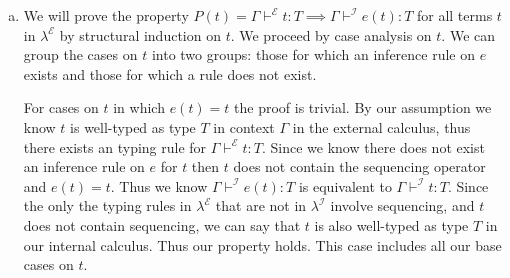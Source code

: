 \documentclass[12pt, fleqn]{article}
\begin{document}
\begin{enumerate}[(a)]
    \textbf{Case:} E-App2\\
    If $e(t)$ evaluates to $e(t')$ by E-App2 then we know $e(t') = (\lambda x: \textrm{Unit}.\:t_2')\:\:t_1''$ and have the premise
    $t_1' \xrightarrow{\mathcal{I}} t_1''$. Setting $e(y) = t_1''$, by the definition of $e$ with the premises $x \notin FV(t_2')$
    and $e(t_2) = t_2'$ we have $t' = y\:\textrm{;}\:t_2$. By our induction hypothesis on $t_1$ with the premises $e(t_1) = t_1'$ and
    $t_1' \xrightarrow{\mathcal{I}} t_1''$ we know $t_1 \xrightarrow{\mathcal{E}} y$. Since $t_1 \xrightarrow{\mathcal{E}} y$, by E-Seq
    we know $t_1\:\textrm{;}\:t_2 \xrightarrow{\mathcal{E}} y\:\textrm{;}\:t_2$, which is $t \xrightarrow{\mathcal{E}} t'$. Thus our
    property holds for the E-App2 case.

    \textbf{Case:} E-AppAbs\\
    If $e(t)$ evaluates to $e(t')$ by E-AppAbs then we know $e(t') = t_2'$ since $x \notin FV(t_2')$ by our premises.
    By our premises $e(t_2) = t_2'$ thus $t' = t_2$. If $e(t)$ is well typed then we know $t_1$ must be a value of type Unit.
    The only value of type Unit is \texttt{unit}. Thus by setting $t_1 = \texttt{unit}$ and using the E-SeqNext evaluation
    rule we have $t \xrightarrow{\mathcal{E}} t'$ and our property holds for the E-AppAbs case.

    Thus we've shown that our property holds for terms for which there exists an inference rule on $e$ as part of our
    induction step. Thus our induction step holds for all cases.

    Therefore, we've shown that our property $P(t)$ holds for all terms $t$ in $\lambda^{\mathcal{E}}$ by structural 
    induction on $t$.\qed

    \item We will prove the property $P(t) = \Gamma \vdash^{\mathcal{E}} t : T \implies \Gamma \vdash^{\mathcal{I}} e(t) : T$ for all terms
    $t$ in $\lambda^\mathcal{E}$ by structural induction on $t$. We proceed by case analysis on $t$.
    We can group the cases on $t$ into two groups: those for which an inference rule on $e$ exists and those for which a rule does not
    exist. 

    For cases on $t$ in which $e(t) = t$ the proof is trivial.
    By our assumption we know $t$ is well-typed as type $T$ in context $\Gamma$ in the external calculus, thus there exists an typing rule for 
    $\Gamma \vdash^{\mathcal{E}} t : T$.
    Since we know there does not exist an inference rule on $e$ for $t$ then $t$ does not contain the sequencing operator and $e(t) = t$.
    Thus we know $\Gamma \vdash^{\mathcal{I}} e(t) : T$ is equivalent to $\Gamma \vdash^{\mathcal{I}} t : T$. Since the only the typing rules in
    $\lambda^{\mathcal{E}}$ that are not in $\lambda^{\mathcal{I}}$ involve sequencing, and $t$ does not contain sequencing, we can say that $t$ is
    also well-typed as type $T$ in our internal calculus. Thus our property holds. This case includes all our base cases on $t$.


\end{enumerate}
\end{document}
